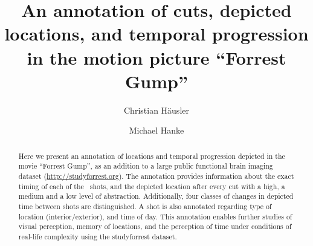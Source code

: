 \documentclass[10pt,a4paper]{article}
\begin{document}


\title{An annotation of cuts, depicted locations, and temporal progression in
the motion picture ``Forrest Gump''}

\author[1]{Christian Häusler}
\author[1,2]{Michael Hanke}

\maketitle
\thispagestyle{fancy}

\begin{multicols}{1}
\begin{abstract}

Here we present an annotation of locations and temporal progression depicted in
the movie ``Forrest Gump'', as an addition to a large public functional brain
imaging dataset (\url{http://studyforrest.org}).  The annotation provides
information about the exact timing of each of the \NShots\ shots, and the
depicted location after every cut with a high, a medium and a low level of
abstraction.  Additionally, four classes of changes in depicted time between
shots are distinguished.  A shot is also annotated regarding type of location
(interior/exterior), and time of day.  This annotation enables further studies
of visual perception, memory of locations, and the perception of time under
conditions of real-life complexity using the studyforrest dataset.

\end{abstract}
\end{multicols}
\end{document}
